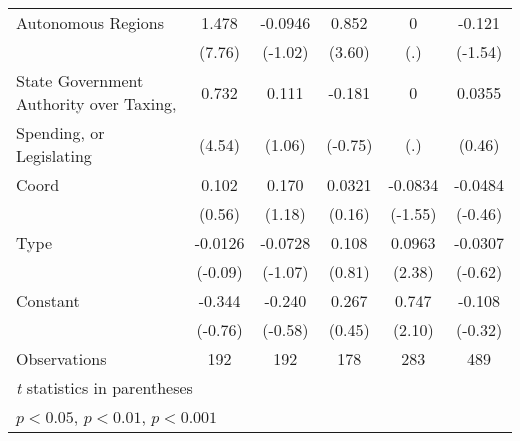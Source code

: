 \begin{table}[htbp]
\begin{tabular}{l*{5}{c}}
Autonomous Regions                      &    1.478\sym{***}&  -0.0946         &    0.852\sym{**} &        0         &   -0.121         \\
                                        &   (7.76)         &  (-1.02)         &   (3.60)         &      (.)         &  (-1.54)         \\
\addlinespace
State Government Authority over Taxing, &    0.732\sym{***}&    0.111         &   -0.181         &        0         &   0.0355         \\
Spending, or Legislating                &   (4.54)         &   (1.06)         &  (-0.75)         &      (.)         &   (0.46)         \\
\addlinespace
Coord                                   &    0.102         &    0.170         &   0.0321         &  -0.0834         &  -0.0484         \\
                                        &   (0.56)         &   (1.18)         &   (0.16)         &  (-1.55)         &  (-0.46)         \\
\addlinespace
Type                                    &  -0.0126         &  -0.0728         &    0.108         &   0.0963\sym{*}  &  -0.0307         \\
                                        &  (-0.09)         &  (-1.07)         &   (0.81)         &   (2.38)         &  (-0.62)         \\
\addlinespace
Constant                                &   -0.344         &   -0.240         &    0.267         &    0.747\sym{*}  &   -0.108         \\
                                        &  (-0.76)         &  (-0.58)         &   (0.45)         &   (2.10)         &  (-0.32)         \\
\midrule
Observations                            &      192         &      192         &      178         &      283         &      489         \\
\bottomrule
\multicolumn{6}{l}{\footnotesize \textit{t} statistics in parentheses}\\
\multicolumn{6}{l}{\footnotesize \sym{*} \(p<0.05\), \sym{**} \(p<0.01\), \sym{***} \(p<0.001\)}\\
\end{tabular}
\end{table}

